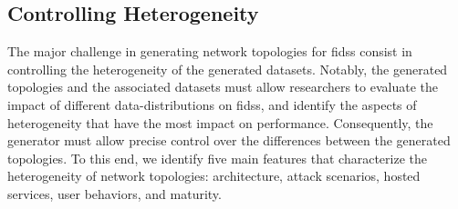 \subsection{Controlling Heterogeneity\label{sec:topologies.req.heterog}}

The major challenge in generating network topologies for \glspl{fids} consist in controlling the heterogeneity of the generated datasets.
Notably, the generated topologies and the associated datasets must allow researchers to evaluate the impact of different data-distributions on \glspl{fids}, and identify the aspects of heterogeneity that have the most impact on performance.
Consequently, the generator must allow precise control over the differences between the generated topologies.
To this end, we identify five main features that characterize the heterogeneity of network topologies: architecture, attack scenarios, hosted services, user behaviors, and maturity.

